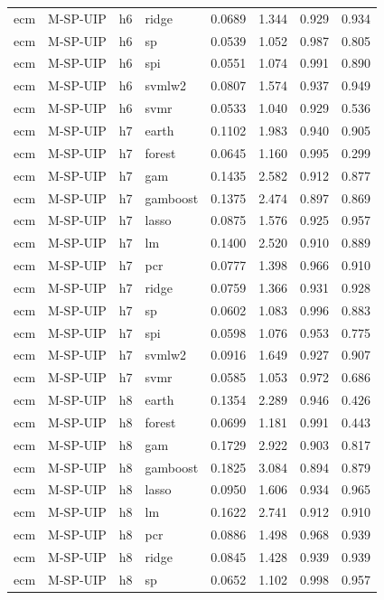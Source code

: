 \begin{ThreePartTable}
\begin{longtable}[t]{llclcccc}
ecm & M-SP-UIP & h6 & ridge & 0.0689 & 1.344 & 0.929 & 0.934\\
ecm & M-SP-UIP & h6 & sp & 0.0539 & 1.052 & 0.987 & 0.805\\
ecm & M-SP-UIP & h6 & spi & 0.0551 & 1.074 & 0.991 & 0.890\\
ecm & M-SP-UIP & h6 & svmlw2 & 0.0807 & 1.574 & 0.937 & 0.949\\
ecm & M-SP-UIP & h6 & svmr & 0.0533 & 1.040 & 0.929 & 0.536\\
\addlinespace
ecm & M-SP-UIP & h7 & earth & 0.1102 & 1.983 & 0.940 & 0.905\\
ecm & M-SP-UIP & h7 & forest & 0.0645 & 1.160 & 0.995 & 0.299\\
ecm & M-SP-UIP & h7 & gam & 0.1435 & 2.582 & 0.912 & 0.877\\
ecm & M-SP-UIP & h7 & gamboost & 0.1375 & 2.474 & 0.897 & 0.869\\
ecm & M-SP-UIP & h7 & lasso & 0.0875 & 1.576 & 0.925 & 0.957\\
ecm & M-SP-UIP & h7 & lm & 0.1400 & 2.520 & 0.910 & 0.889\\
ecm & M-SP-UIP & h7 & pcr & 0.0777 & 1.398 & 0.966 & 0.910\\
ecm & M-SP-UIP & h7 & ridge & 0.0759 & 1.366 & 0.931 & 0.928\\
ecm & M-SP-UIP & h7 & sp & 0.0602 & 1.083 & 0.996 & 0.883\\
ecm & M-SP-UIP & h7 & spi & 0.0598 & 1.076 & 0.953 & 0.775\\
ecm & M-SP-UIP & h7 & svmlw2 & 0.0916 & 1.649 & 0.927 & 0.907\\
ecm & M-SP-UIP & h7 & svmr & 0.0585 & 1.053 & 0.972 & 0.686\\
\addlinespace
ecm & M-SP-UIP & h8 & earth & 0.1354 & 2.289 & 0.946 & 0.426\\
ecm & M-SP-UIP & h8 & forest & 0.0699 & 1.181 & 0.991 & 0.443\\
ecm & M-SP-UIP & h8 & gam & 0.1729 & 2.922 & 0.903 & 0.817\\
ecm & M-SP-UIP & h8 & gamboost & 0.1825 & 3.084 & 0.894 & 0.879\\
ecm & M-SP-UIP & h8 & lasso & 0.0950 & 1.606 & 0.934 & 0.965\\
ecm & M-SP-UIP & h8 & lm & 0.1622 & 2.741 & 0.912 & 0.910\\
ecm & M-SP-UIP & h8 & pcr & 0.0886 & 1.498 & 0.968 & 0.939\\
ecm & M-SP-UIP & h8 & ridge & 0.0845 & 1.428 & 0.939 & 0.939\\
ecm & M-SP-UIP & h8 & sp & 0.0652 & 1.102 & 0.998 & 0.957\\

\end{longtable}
\end{ThreePartTable}
